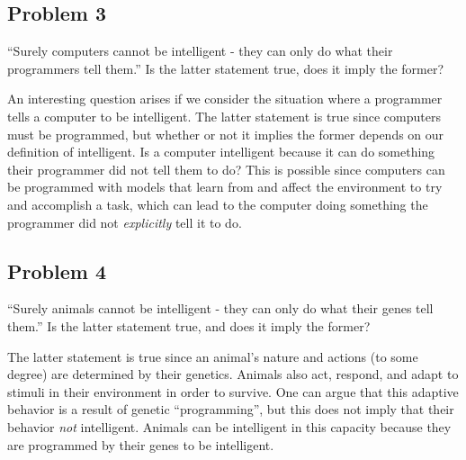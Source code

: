 \documentclass{math}
\begin{document}
\subsection*{Problem 3}
``Surely computers cannot be intelligent - they can only do what their
programmers tell them.'' Is the latter statement true, does it imply the former?
\par An interesting question arises if we consider the situation where a
programmer tells a computer to be intelligent. The latter statement is true
since computers must be programmed, but whether or not it implies the former
depends on our definition of intelligent. Is a computer intelligent because it
can do something their programmer did not tell them to do? This is possible
since computers can be programmed with models that learn from and affect the
environment to try and accomplish a task, which can lead to the computer doing
something the programmer did not \textit{explicitly} tell it to do.

\subsection*{Problem 4}
``Surely animals cannot be intelligent - they can only do what their genes tell
them.'' Is the latter statement true, and does it imply the former?
\par The latter statement is true since an animal's nature and actions (to some
degree) are determined by their genetics. Animals also act, respond, and
adapt to stimuli in their environment in order to survive. One can argue that
this adaptive behavior is a result of genetic ``programming'', but this does
not imply that their behavior \textit{not} intelligent. Animals can be
intelligent in this capacity because they are programmed by their genes to be
intelligent.
\end{document}
